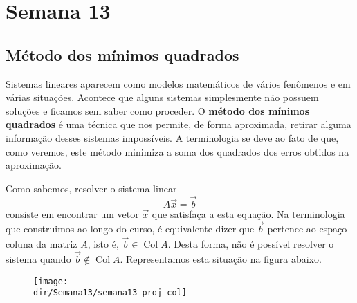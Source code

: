 \documentclass[../livro.tex]{subfiles}  %
\providecommand{\dir}{..}
\begin{document}
	
\chapter{Semana 13}



\section{Método dos mínimos quadrados}

Sistemas lineares aparecem como modelos matemáticos de vários fenômenos e em várias situações. Acontece que alguns sistemas simplesmente não possuem soluções e ficamos sem saber como proceder. O \textbf{método dos mínimos quadrados} é uma técnica que nos permite, de forma aproximada, retirar alguma informação desses sistemas impossíveis. A terminologia se deve ao fato de que, como veremos, este método minimiza a soma dos quadrados dos erros obtidos na aproximação.

Como sabemos, resolver o sistema linear
\begin{equation}
A \vec{x} = \vec{b}
\end{equation} consiste em encontrar um vetor $\vec{x}$ que satisfaça a esta equação. Na terminologia que construimos ao longo do curso, é equivalente dizer que $\vec{b}$ pertence ao espaço coluna da matriz $A$, isto é, $\vec{b} \in \operatorname{Col} A$. Desta forma, não é possível resolver o sistema quando $\vec{b} \not\in \operatorname{Col} A$. Representamos esta situação na figura abaixo.
\begin{figure}[h!]
  \begin{center}
    \texttt{[image: \\dir/Semana13/semana13-proj-col]}
  \end{center}
\end{figure}
\end{document}
